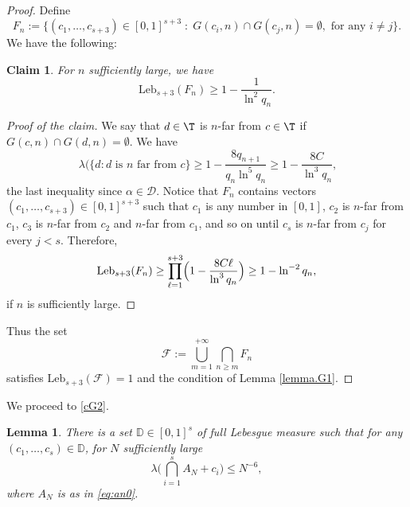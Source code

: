 \documentclass[JEP,XML,SOM,Unicode,NoFloatCountersInSection]{cedram}
\newcommand\cD{\mathcal{D}}
\newcommand\cF{\mathcal{F}}
\newcommand\Leb{\mathrm{Leb}}
\theoremstyle{definition}
\theoremstyle{plain}
\newtheorem{lemma}[definition]{Lemma}
\newtheorem*{claim}{Claim}
\begin{document}
\begin{proof} Define
\begin{equation}\label{eq:fn}
F_n:=\big\{(c_1,\ldots, c_{s+3})\in [0,1]^{s+3}\;:\; G(c_i,n)\cap G(c_j,n)=\emptyset, \text{ for any } i\neq j\big\}.
\end{equation}
We have the following:

\begin{claim}
For $n$ sufficiently large, we have
\[
\Leb_{s+3}(F_n)\geq 1-\frac{1}{\ln^2q_n}.
\]
\end{claim}

\begin{proof}[Proof of the claim] We say that $d\in \T$ is $n$-far from $c\in \T$ if $G(c,n)\cap G(d,n)=\emptyset$. We have
\[
\
\lambda(\{d: d \text{ is } n \text{ far from } c\}\geq 1-\frac{8q_{n+1}}{q_n\ln^5q_n}\geq 1-\frac{8{C}}{\ln^3q_n},
\] the last inequality since $\alpha\in \cD$. Notice that $F_n$ contains vectors $(c_1,\ldots,c_{s+3})\in [0,1]^{s+3}$ such that $c_1$ is any number in $[0,1]$, $c_2$ is $n$-far from $c_1$, $c_3$ is $n$-far from $c_2$ and $n$-far from $c_1$, and so on until $c_s$ is $n$-far from $c_j$ for every $j<s$. Therefore,
\[
\Leb_{s+3}(F_n)\geq \prod_{\ell=1}^{s+3} \Bigl(1-\frac{8{C}\ell}{\ln^3q_n}\Bigr)\geq 1-\ln^{-2}q_n,
\]
if $n$ is sufficiently large.
\end{proof}
Thus the set
\begin{equation*}%
\cF:=\bigcup_{m=1}^{+\infty} \bigcap_{n\geq m}F_n
\end{equation*}
satisfies $\Leb_{s+3}(\cF)=1$ and the condition of Lemma \ref{lemma.G1}.
\end{proof}

We proceed to \eqref{cG2}.

\begin{lemma} \label{lemma.G2}There is a set
$\mathbb{D}\in [0,1]^s$ of full Lebesgue measure such that for any $(c_1,\ldots,c_s)\in \mathbb{D}$, for $N$ sufficiently large
\[
\lambda\Big(\bigcap_{i=1}^sA_N+c_{i}\Big)\leq N^{-6},
\]
where $A_N$ is as in \eqref{eq:an0}.
\end{lemma}
\end{document}
